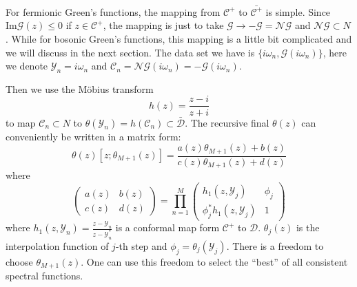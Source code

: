 \documentclass[
	preprint,%
	aps,
	prb,
	showpacs,	
	amsmath, amssymb]{revtex4-2}
\DeclareRobustCommand{\+}{\hstretch{1.25} {\boldsymbol {\mathrel{+}}}}
\newcommand{\im}{ {\mathrm{Im}} }
\newcommand{\Y}{ {\mathcal{Y}} }
\newcommand{\C}{ {\mathcal{C}} }
\newcommand{\D}{ {\mathcal{D}} }
\newcommand{\Dbar}{ {\bar{\mathcal{D}}} }
\begin{document}
For fermionic Green's functions, the mapping from $\C^+$ to 
$\bar{\C^+}$ is simple. Since $\im \mathcal{G}(z) \leq 0$ if 
$z \in \C^+$, the mapping is just to take 
$\mathcal{G} \to -\mathcal{G} = \mathcal{NG}$ and $\mathcal{NG} \subset N$. While for 
bosonic Green's functions, this mapping is a little bit complicated and 
we will discuss in the next section. The data set we have is 
$\{i\omega_n, \mathcal{G}(i\omega_n)\}$, here we denote $\Y_n = i\omega_n$ 
and $\C_n = \mathcal{NG}(i\omega_n) = -\mathcal{G}(i\omega_n)$. 

Then we use the Möbius transform
\begin{equation}\label{eq:Mobius-transform}
	h(z) = \frac{z - i}{z + i}
\end{equation}
to map $\C_n \subset N$ to 
$\theta(\Y_n) = h(\C_n) \subset \Dbar$. 
The recursive final $\theta(z)$ can conveniently be written in a
matrix form:
\begin{equation}\label{eq:recursive-theta}
	\theta(z)[z;\theta_{M+1}(z)] 
		= \frac{a(z)\theta_{M+1}(z) + b(z)}{c(z)\theta_{M+1}(z) + d(z)}
\end{equation}
where
\begin{equation}\label{eq:factor-matrix}
	\left(
		\begin{matrix}
			a(z) & b(z) \\
			c(z) & d(z)
		\end{matrix}
	\right) = \prod_{n=1}^M
	\left(
		\begin{matrix}
			h_1(z, \Y_j) & \phi_j \\
			\phi_j^* h_1(z, \Y_j) & 1
		\end{matrix}
	\right)
\end{equation}
where $h_1(z, \Y_n) = \frac{z - \Y_n}{z -\Y_n^*}$ 
is a conformal map form $\C^+$ to $\D$. $\theta_j(z)$ is 
the interpolation function of $j$-th step and
$\phi_j = \theta_j(\Y_j)$. There is a freedom to choose $\theta_{M+1}(z)$.
One can use this freedom to select the “best” of all consistent spectral functions.







\end{document}
